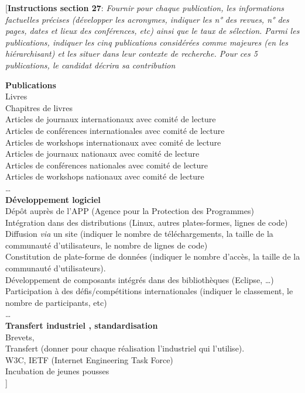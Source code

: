 \documentclass[a4paper,10pt]{article}
\newcommand{\instructionsSection}[1]{{\color{blue}[\textbf{Instructions section 27}: #1]}}
\newcommand{\instructionsSection}[1]{}
\begin{document}
\instructionsSection{\emph{Fournir pour chaque publication, les informations factuelles précises (développer les acronymes, indiquer les n° des revues, n° des pages, dates et lieux des conférences, etc) ainsi que le taux de sélection.
Parmi les publications, indiquer les cinq publications considérées comme majeures (en les hiérarchisant) et les situer dans leur contexte de recherche. Pour ces 5 publications, le candidat décrira sa contribution}

\bigskip

\textbf{Publications}\\
Livres\\
Chapitres de livres\\
Articles de journaux internationaux avec comité de lecture\\
Articles de conférences internationales avec comité de lecture\\
Articles de workshops internationaux avec comité de lecture\\
Articles de journaux nationaux avec comité de lecture\\
Articles de conférences nationales avec comité de lecture\\
Articles de workshops nationaux avec comité de lecture\\
…\\
\textbf{Développement logiciel}\\
Dépôt auprès de l'APP (Agence pour la Protection des Programmes)\\
Intégration dans des distributions (Linux, autres plates-formes, lignes de code)\\
Diffusion \emph{via} un site (indiquer le nombre de téléchargements, la taille de la communauté d'utilisateurs, le nombre de lignes de code)\\
Constitution de plate-forme de données (indiquer le nombre d'accès, la taille de la communauté d'utilisateurs).
\\ Développement de composants intégrés dans des bibliothèques (Eclipse, …)\\
Participation à des défis/compétitions internationales (indiquer le classement, le nombre de participants, etc)\\
…\\
\textbf{Transfert industriel , standardisation}\\
Brevets,\\
Transfert (donner pour chaque réalisation l'industriel qui l'utilise).\\
W3C, IETF (Internet Engineering Task Force)\\
Incubation de jeunes pousses\\
}
\end{document}
